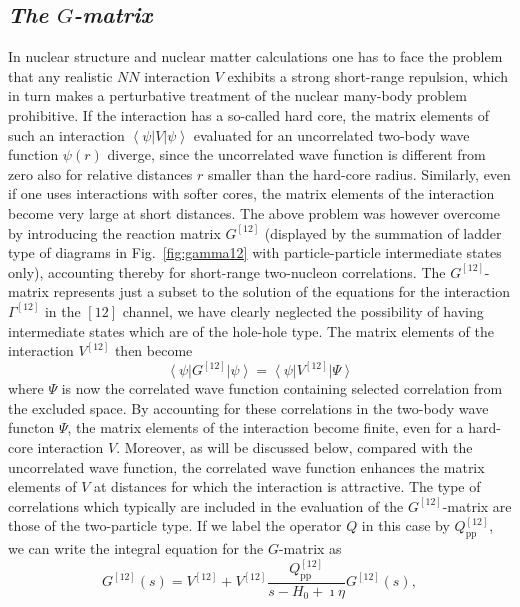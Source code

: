 \documentclass{article}
\newcommand{\bra}[1]{\left\langle #1 \right|}
\newcommand{\ket}[1]{\left| #1 \right\rangle}
\begin{document}
\subsection{\it The $G$-matrix}

In nuclear structure and nuclear matter calculations one has to
face the problem that any realistic $NN$ interaction $V$
exhibits a strong short-range repulsion, which in turn makes
a perturbative treatment of the nuclear many-body problem
prohibitive. If the interaction has a so-called hard core,
the matrix elements of such an interaction $\bra{\psi}V\ket{\psi}$
evaluated
for an uncorrelated two-body wave function $\psi (r)$ diverge,
since the uncorrelated wave function is different from zero also for
relative distances $r$ smaller than the hard-core radius. Similarly,
even if one uses interactions with softer cores, the matrix elements of the
interaction become very large at short distances.
The above problem was however overcome by
introducing the reaction matrix $G^{[12]}$ (displayed by  the summation
of ladder type of diagrams in Fig.\ \ref{fig:gamma12}
with particle-particle intermediate states only),
accounting thereby for short-range two-nucleon correlations.
The $G^{[12]}$-matrix represents just a subset to the solution
of the equations for the interaction $\Gamma^{[12]}$ in the $[12]$ channel,
we have clearly neglected the possibility of having intermediate states
which are of the hole-hole type.
The matrix elements of the
interaction $V^{[12]}$ then become
\begin{equation}
\bra{\psi}G^{[12]}\ket{\psi} =\bra{\psi}V^{[12]}\ket{\Psi}
\end{equation}
where $\Psi$ is now the correlated wave function
containing selected correlation from the excluded space.
By accounting for these
correlations in the two-body wave functon $\Psi$, the matrix elements of
the interaction become finite, even for a hard-core interaction $V$. Moreover,
as will be discussed below, compared with the uncorrelated
wave function, the correlated wave function enhances the
matrix elements of $V$ at distances for which the interaction is
attractive.
The type of correlations which typically are included in the evaluation
of the $G^{[12]}$-matrix are those of the two-particle type.
If we label the operator $Q$ in this case by $Q^{[12]}_{\mathrm{pp}}$, we can write
the integral equation for the $G$-matrix as
\begin{equation}
   G^{[12]}(s)=V^{[12]}+V^{[12]}\frac{Q^{[12]}_{\mathrm{pp}}}
           {s -H_0+\imath \eta}G^{[12]}(s),
   \label{eq:g1}
\end{equation}
\end{document}
